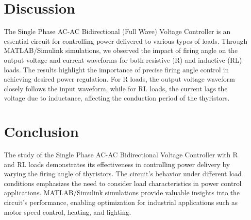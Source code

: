 \documentclass[12pt]{article}
\begin{document}
\section*{Discussion}
The Single Phase AC-AC Bidirectional (Full Wave) Voltage Controller is an essential circuit for controlling power delivered to various types of loads. Through MATLAB/Simulink simulations, we observed the impact of firing angle on the output voltage and current waveforms for both resistive (R) and inductive (RL) loads. The results highlight the importance of precise firing angle control in achieving desired power regulation. For R loads, the output voltage waveform closely follows the input waveform, while for RL loads, the current lags the voltage due to inductance, affecting the conduction period of the thyristors.

\section*{Conclusion}
The study of the Single Phase AC-AC Bidirectional Voltage Controller with R and RL loads demonstrates its effectiveness in controlling power delivery by varying the firing angle of thyristors. The circuit's behavior under different load conditions emphasizes the need to consider load characteristics in power control applications. MATLAB/Simulink simulations provide valuable insights into the circuit's performance, enabling optimization for industrial applications such as motor speed control, heating, and lighting.


\renewcommand{\bibname}{References}

\end{document}

